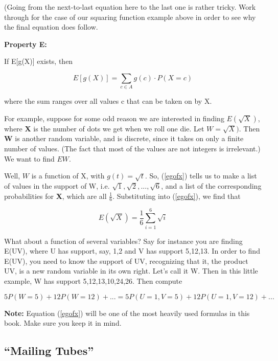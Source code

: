 (Going from the next-to-last equation here to the last one is rather
tricky.  Work through for the case of our squaring function example
above in order to see why the final equation does follow.

{\bf Property E:}

If E[g(X)] exists, then

\begin{equation}
\label{egofx}
E[g(X)] = \sum_{c \in A} g(c) \cdot P(X = c)
\end{equation}

where the sum ranges over all values c that can be taken on by X.

For example, suppose for some odd reason we are interested in finding
$E(\sqrt{X})$, where {\bf X} is the number of dots we get when we roll
one die.  Let $W = \sqrt{X})$.  Then {\bf W} is another random variable,
and is discrete, since it takes on only a finite number of values.  (The
fact that most of the values are not integers is irrelevant.)  We want
to find $EW$.

Well, $W$ is a function of X, with $g(t) = \sqrt{t}$.  So,
(\ref{egofx}) tells us to make a list of values in the support
of W, i.e.  $\sqrt{1}, \sqrt{2}, ..., \sqrt{6}$, and a list of the
corresponding probabilities for {\bf X}, which are all $\frac{1}{6}$.
Substituting into (\ref{egofx}), we find that

\begin{equation}
E(\sqrt{X}) = \frac{1}{6} \sum_{i=1}^6 \sqrt{i}
\end{equation}

What about a function of several variables?  Say for instance 
you are finding E(UV), where U has support, say, 1,2 and V has
support 5,12,13.  In order to find E(UV), you need to know the support
of UV, recognizing that it, the product UV, is a new random variable in
its own right.  Let's call it W.  Then in this little example, W has
support 5,12,13,10,24,26.  Then compute

$$
5 P(W = 5) + 12 P(W = 12) + ...
= 5 P(U = 1, V = 5) + 12 P(U = 1, V = 12) + ...
$$

{\bf Note:}  Equation (\ref{egofx}) will be one of the most heavily used
formulas in this book.  Make sure you keep it in mind.

\subsection{``Mailing Tubes''}
\label{mailingtubes2}

